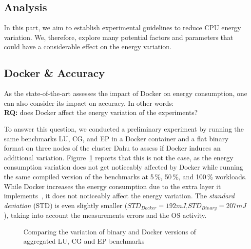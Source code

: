 \subsection{Analysis}\label{subsec:parameters}
In this part, we aim to establish experimental guidelines to reduce CPU energy variation.
We, therefore, explore many potential factors and parameters that could have a considerable effect on the energy variation.

\subsection{Docker \& Accuracy}
As the state-of-the-art assesses the impact of Docker on energy consumption, one can also consider its impact on accuracy.
In other words:\\
\textbf{RQ:} does Docker affect the energy variation of the experiments?

To answer this question, we conducted a preliminary experiment by running the same benchmarks \textsf{LU}, \textsf{CG}, and \textsf{EP} in a Docker container and a flat binary format on three nodes of the cluster \textsf{Dahu} to assess if Docker induces an additional variation.
Figure~\ref{fig:docker} reports that this is not the case, as the energy consumption variation does not get noticeably affected by Docker while running the same compiled version of the benchmarks at 5\,\%, 50\,\%, and 100\,\% workloads.
While Docker increases the energy consumption due to the extra layer it implements~\cite{eddie_antonio_santos_how}, it does not noticeably affect the energy variation.
The \emph{standard deviation} (STD) is even slightly smaller ($STD_{Docker}=192 mJ$,$STD_{Binary}=207 mJ$), taking into account the measurements errors and the OS activity.

\begin{figure}
    \caption{Comparing the variation of binary and Docker versions of aggregated \textsf{LU}, \textsf{CG} and \textsf{EP} benchmarks}\label{fig:docker}
\end{figure}

